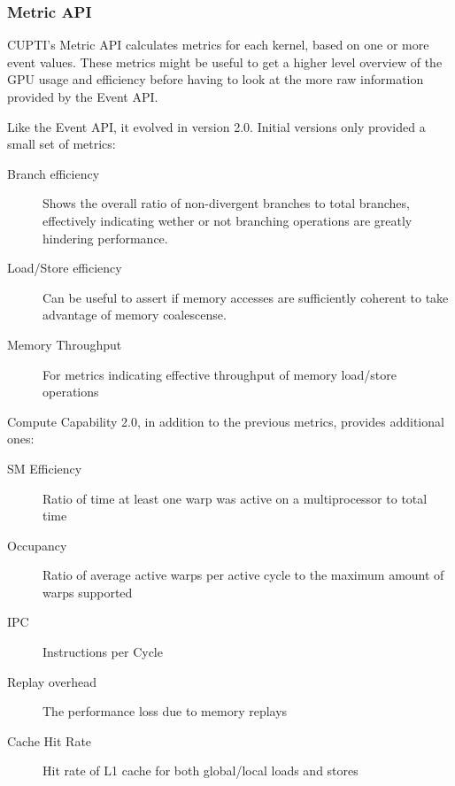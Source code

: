 \subsubsection{Metric API}
\label{sec:cuda:prof:metric}


CUPTI's Metric API calculates metrics for each kernel, based on one or more event values. These metrics might be useful to get a higher level overview of the GPU usage and efficiency before having to look at the more raw information provided by the Event API.

Like the Event API, it evolved in version 2.0. Initial versions only provided a small set of metrics:

\begin{description}
	\item[Branch efficiency] Shows the overall ratio of non-divergent branches to total branches, effectively indicating wether or not branching operations are greatly hindering performance.

	\item[Load/Store efficiency] Can be useful to assert if memory accesses are sufficiently coherent to take advantage of memory coalescense.

	\item[Memory Throughput] For metrics indicating effective throughput of memory load/store operations
\end{description}

Compute Capability 2.0, in addition to the previous metrics, provides additional ones:

\begin{description}
	\item[SM Efficiency] Ratio of time at least one warp was active on a multiprocessor to total time

	\item[Occupancy] Ratio of average active warps per active cycle to the maximum amount of warps supported

	\item[IPC] Instructions per Cycle

	\item[Replay overhead] The performance loss due to memory replays

	\item[Cache Hit Rate] Hit rate of L1 cache for both global/local loads and stores

\end{description}